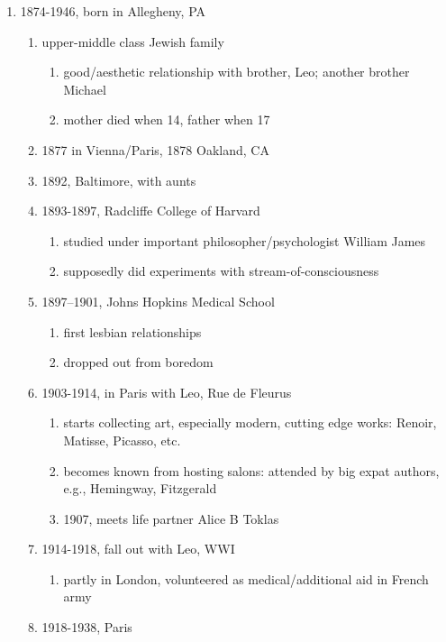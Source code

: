 \documentclass[12pt]{article}
\begin{document}
\begin{enumerate}
\item 1874-1946, born in Allegheny, PA
    \begin{enumerate}
    \item upper-middle class Jewish family
        \begin{enumerate}
        \item good/aesthetic relationship with brother, Leo; another brother Michael
        \item mother died when 14, father when 17
        \end{enumerate}
    \item 1877 in Vienna/Paris, 1878 Oakland, CA
    \item 1892, Baltimore, with aunts
    \item 1893-1897, Radcliffe College of Harvard
        \begin{enumerate}
        \item studied under important philosopher/psychologist William James
        \item supposedly did experiments with stream-of-consciousness
        \end{enumerate}
    \item 1897--1901, Johns Hopkins Medical School
        \begin{enumerate}
        \item first lesbian relationships
        \item dropped out from boredom
        \end{enumerate}
    \item 1903-1914, in Paris with Leo, Rue de Fleurus
        \begin{enumerate}
        \item starts collecting art, especially modern, cutting edge works: Renoir, Matisse, Picasso, etc.
        \item becomes known from hosting salons: attended by big expat authors, e.g., Hemingway, Fitzgerald
        \item 1907, meets life partner Alice B Toklas
        \end{enumerate}
    \item 1914-1918, fall out with Leo, WWI
        \begin{enumerate}
        \item partly in London, volunteered as medical/additional aid in French army
        \end{enumerate}
    \item 1918-1938, Paris

\end{enumerate}
\end{enumerate}
\end{document}
